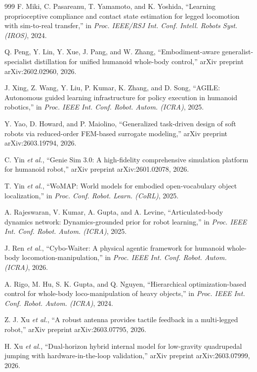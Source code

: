﻿\documentclass[11pt,a4paper]{article}
\begin{document}
\begin{thebibliography}{999}
F. Miki, C. Pasareanu, T. Yamamoto, and K. Yoshida, ``Learning proprioceptive compliance and contact state estimation for legged locomotion with sim-to-real transfer,'' in \textit{Proc. IEEE/RSJ Int. Conf. Intell. Robots Syst. (IROS)}, 2024.

Q. Peng, Y. Lin, Y. Xue, J. Pang, and W. Zhang, ``Embodiment-aware generalist-specialist distillation for unified humanoid whole-body control,'' arXiv preprint arXiv:2602.02960, 2026.

J. Xing, Z. Wang, Y. Liu, P. Kumar, K. Zhang, and D. Song, ``{AGILE}: Autonomous guided learning infrastructure for policy execution in humanoid robotics,'' in \textit{Proc. IEEE Int. Conf. Robot. Autom. (ICRA)}, 2025.

Y. Yao, D. Howard, and P. Maiolino, ``Generalized task-driven design of soft robots via reduced-order FEM-based surrogate modeling,'' arXiv preprint arXiv:2603.19794, 2026.

C. Yin \textit{et al.}, ``{Genie Sim 3.0}: A high-fidelity comprehensive simulation platform for humanoid robot,'' arXiv preprint arXiv:2601.02078, 2026.

T. Yin \textit{et al.}, ``{WoMAP}: World models for embodied open-vocabulary object localization,'' in \textit{Proc. Conf. Robot. Learn. (CoRL)}, 2025.

A. Rajeswaran, V. Kumar, A. Gupta, and A. Levine, ``Articulated-body dynamics network: Dynamics-grounded prior for robot learning,'' in \textit{Proc. IEEE Int. Conf. Robot. Autom. (ICRA)}, 2025.

J. Ren \textit{et al.}, ``Cybo-Waiter: A physical agentic framework for humanoid whole-body locomotion-manipulation,'' in \textit{Proc. IEEE Int. Conf. Robot. Autom. (ICRA)}, 2026.

A. Rigo, M. Hu, S. K. Gupta, and Q. Nguyen, ``Hierarchical optimization-based control for whole-body loco-manipulation of heavy objects,'' in \textit{Proc. IEEE Int. Conf. Robot. Autom. (ICRA)}, 2024.

Z. J. Xu \textit{et al.}, ``A robust antenna provides tactile feedback in a multi-legged robot,'' arXiv preprint arXiv:2603.07795, 2026.

H. Xu \textit{et al.}, ``Dual-horizon hybrid internal model for low-gravity quadrupedal jumping with hardware-in-the-loop validation,'' arXiv preprint arXiv:2603.07999, 2026.


\end{thebibliography}
\end{document}
